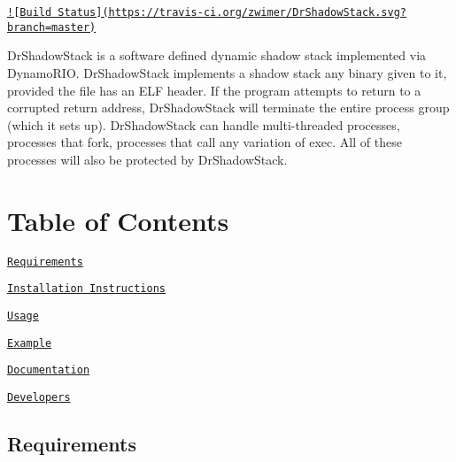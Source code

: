 \href{https://travis-ci.org/zwimer/DrShadowStack}{\tt !\mbox{[}Build Status\mbox{]}(https\-://travis-\/ci.\-org/zwimer/\-Dr\-Shadow\-Stack.\-svg?branch=master)}

Dr\-Shadow\-Stack is a software defined dynamic shadow stack implemented via Dynamo\-R\-I\-O. Dr\-Shadow\-Stack implements a shadow stack any binary given to it, provided the file has an E\-L\-F header. If the program attempts to return to a corrupted return address, Dr\-Shadow\-Stack will terminate the entire process group (which it sets up). Dr\-Shadow\-Stack can handle multi-\/threaded processes, processes that fork, processes that call any variation of exec. All of these processes will also be protected by Dr\-Shadow\-Stack.

\section*{Table of Contents}


\begin{DoxyEnumerate}
\item \href{#requirements}{\tt Requirements}
\end{DoxyEnumerate}
\begin{DoxyEnumerate}
\item \href{#installation-instructions}{\tt Installation Instructions}
\end{DoxyEnumerate}
\begin{DoxyEnumerate}
\item \href{#usage}{\tt Usage}
\end{DoxyEnumerate}
\begin{DoxyEnumerate}
\item \href{#example}{\tt Example}
\end{DoxyEnumerate}
\begin{DoxyEnumerate}
\item \href{#documentation}{\tt Documentation}
\end{DoxyEnumerate}
\begin{DoxyEnumerate}
\item \href{#developers}{\tt Developers}
\end{DoxyEnumerate}

\subsection*{Requirements}


